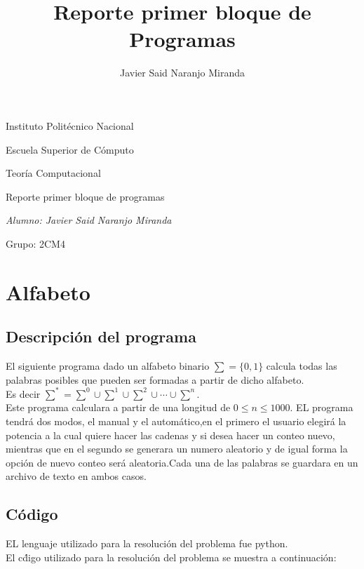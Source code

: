 \documentclass[12pt,letterpaper]{article}
\title{Reporte primer bloque de Programas}
\author{Javier Said Naranjo Miranda}
\begin{document}
\begin{titlepage}
\centering
	{\LARGE Instituto Polit\'ecnico Nacional \par}
	\vspace{1cm}
	{\Large Escuela Superior de C\'omputo \par}	
	\vspace{1.5cm}
	{\large Teor\'ia Computacional \par}
	\vspace{1cm}
	{\Large Reporte primer bloque de programas \par}
	\vspace{1.5cm}
	{\Large\itshape Alumno: Javier Said Naranjo Miranda \par}
	\vfill
	Grupo: 2CM4 \par
	\vfill	
	\newpage
	

\end{titlepage}
	
\raggedright
\tableofcontents
\newpage
	
\section{ Alfabeto}
\subsection{ Descripci\'on del programa}
\justify
El siguiente programa dado un alfabeto binario $\sum = \lbrace 0, 1 \rbrace $  calcula todas las palabras posibles que pueden ser formadas a partir de dicho alfabeto.\\
Es decir $\sum^{*} = \sum^{0}\cup{\sum}^{1}\cup{\sum}^{2}\cup\cdots\cup{\sum}^{n}$.\\
Este programa calculara a partir de una longitud de $0 \leq n \leq 1000$.
EL programa tendr\'a dos modos, el manual y el autom\'atico,en el primero el usuario elegir\'a la potencia a la cual quiere hacer las cadenas y si desea hacer un conteo nuevo, mientras que en el segundo se generara un numero aleatorio y de igual forma la opci\'on de nuevo conteo ser\'a aleatoria.Cada una de las palabras se guardara en un archivo de texto en ambos casos.\\
\subsection{C\'odigo}
EL lenguaje utilizado para la resoluci\'on del problema fue python.\\
El c\'digo utilizado para la resoluci\'on del problema se muestra a continuaci\'on:\\
\end{document}
